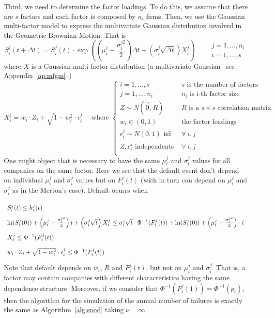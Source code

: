 \documentclass[11pt,fleqn]{book} %
\begin{document}
Third, we need to determine the factor loadings. To do this, we assume that 
there are $s$ factors and each factor is composed by $n_i$ firms. Then, we use 
the Gaussian multi-factor model to express the multivariate Gaussian 
distribution involved in the Geometric Brownian Motion. That is
\begin{equation}
	S_i^j(t+\Delta t) = S_i^j(t) \cdot \exp\left(
	\left(\mu_i^j - \frac{\sigma_i^{j2}}{2}\right) \Delta t +
	\left(\sigma_i^j \sqrt{\Delta t}\right) X_i^j
	\right)
	\qquad
	\begin{array}{l}
		j=1,\dots,n_i
		\\
		i=1,\dots,s 
	\end{array}
\end{equation}
where $X$ is a Gaussian multi-factor distribution (a multivariate Gaussian 
--see Appendix~\ref{ap:mfgm}--)
\begin{displaymath}
	X_i^j = w_i \cdot Z_i + \sqrt{1-w_i^2} \cdot \epsilon_i^j
	\quad \text{ where } \left\{
	\begin{array}{ll}
		i = 1, \dots, s & \text{$s$ is the number of factors} \\
		j = 1, \dots, n_i & \text{$n_i$ is i-th factor size} \\
		Z \sim N(\vec{0},R) & \text{$R$ is a $s {\times} s$ correlation matrix} \\
		w_i \in (0,1) & \text{the factor loadings } \\
		\epsilon_i^j \sim N(0,1) \text { iid } & \forall\ i,j \\
		Z, \epsilon_i^j \text{ independents } & \forall\ i,j \\
	\end{array}
	\right.
\end{displaymath}
One might object that is necessary to have the same $\mu_i^j$ and $\sigma_i^j$ 
values for all companies on the same factor. Here we see that the default event 
don't depend on individual $\mu_i^j$ and $\sigma_i^j$ values but on $F_i^j(t)$ 
(wich in turn can depend on $\mu_i^j$ and $\sigma_i^j$ as in the Merton's case). 
Default ocurrs when
{\small
\begin{displaymath}
	\def\arraystretch{2.0}
	\begin{array}{ll}
		S_i^j(t) \le h_i^j(t) 
		\\
		\ln(S_i^j(0)) + \left(\mu_i^j - \frac{\sigma_i^{j2}}{2}\right) t +
			\left(\sigma_i^j \sqrt{t}\right) X_i^j 
		\le 
		\sigma_i^j\sqrt{t}\cdot\Phi^{-1}(F_i^j(t)) + 
			\ln(S_i^j(0)) + \left(\mu_i^j-\frac{\sigma_i^{j2}}{2}\right)\cdot t
		\\
		X_i^j \le \Phi^{-1}(F_i^j(t))
		\\
		w_i \cdot Z_i + \sqrt{1-w_i^2} \cdot \epsilon_i^j \le \Phi^{-1}(F_i^j(t))
	\end{array}
\end{displaymath}}
Note that default depends on $w_i$, $R$ and $F_i^j(t)$, but not on $\mu_i^j$ and 
$\sigma_i^j$. That is, a factor may contain companies with different characteristics 
having the same dependence structure. Moreover, if we consider that
$\Phi^{-1}(F_i^j(1)) = \Phi^{-1}(p_i)$, then the algorithm for the simulation of 
the annual number of failures is exactly the same as Algorithm~\ref{alg:snod} 
taking $\nu=\infty$.
\end{document}
